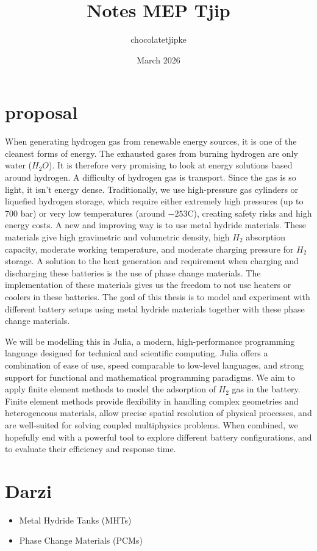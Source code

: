 \documentclass{article}
\title{Notes MEP Tjip}
\author{chocolatetjipke }
\date{March 2026}
\begin{document}
\maketitle

\section{proposal}
When generating hydrogen gas from renewable energy sources, it is one of the cleanest forms of energy. The exhausted gases from burning hydrogen are only water ($H_2O$). It is therefore very promising to look at energy solutions based around hydrogen. A difficulty of hydrogen gas is transport. Since the gas is so light, it isn't energy dense. Traditionally, we use high-pressure gas cylinders or liquefied hydrogen storage, which require either extremely high pressures (up to 700 bar) or very low temperatures (around $-253$C), creating safety risks and high energy costs. A new and improving way is to use metal hydride materials. These materials give high gravimetric and volumetric density, high $H_2$ absorption capacity, moderate working temperature, and moderate charging pressure for $H_2$ storage. A solution to the heat generation and requirement when charging and discharging these batteries is the use of phase change materials. The implementation of these materials gives us the freedom to not use heaters or coolers in these batteries. The goal of this thesis is to model and experiment with different battery setups using metal hydride materials together with these phase change materials.

We will be modelling this in Julia, a modern, high-performance programming language designed for technical and scientific computing. Julia offers a combination of ease of use, speed comparable to low-level languages, and strong support for functional and mathematical programming paradigms. We aim to apply finite element methods to model the adsorption of $H_2$ gas in the battery. Finite element methods provide flexibility in handling complex geometries and heterogeneous materials, allow precise spatial resolution of physical processes, and are well-suited for solving coupled multiphysics problems. When combined, we hopefully end with a powerful tool to explore different battery configurations, and to evaluate their efficiency and response time.

\section{Darzi}
\begin{itemize}
    \item Metal Hydride Tanks (MHTs)
    \item Phase Change Materials (PCMs)
\end{itemize}
\end{document}

